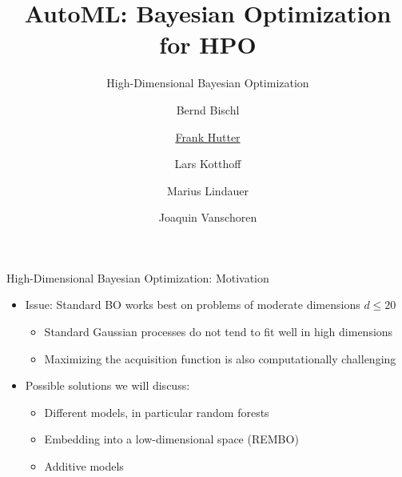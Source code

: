 


\title{AutoML: Bayesian Optimization for HPO}
\subtitle{High-Dimensional Bayesian Optimization}
\author[Marius Lindauer]{Bernd Bischl \and \underline{Frank Hutter} \and Lars Kotthoff\newline \and Marius Lindauer \and Joaquin Vanschoren}
\institute{}
\date{}
    
    
    

\maketitle

\begin{frame}[c]{High-Dimensional Bayesian Optimization: Motivation}

\begin{itemize}
    \item Issue: Standard BO works best on problems of moderate dimensions $d\leq20$
    \begin{itemize}
        \item Standard Gaussian processes do not tend to fit well in high dimensions
        \item Maximizing the acquisition function is also computationally challenging
    \end{itemize}
\medskip
\pause

    \item Possible solutions we will discuss:
    \begin{itemize}
        \item Different models, in particular random forests 
        \item Embedding into a low-dimensional space (REMBO) 
        \item Additive models 
    \end{itemize}
\end{itemize}


\end{frame}


